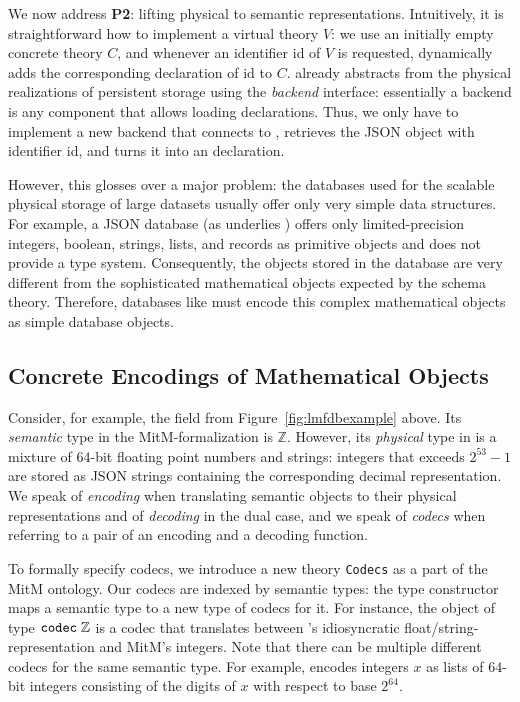 We now address \textbf{P2}: lifting physical to semantic representations.
Intuitively, it is straightforward how to implement a virtual theory $V$: we use an initially empty concrete theory $C$, and whenever an identifier \textsf{id} of $V$ is requested, \mmt dynamically adds the corresponding declaration of \textsf{id} to $C$.
\mmt already abstracts from the physical realizations of persistent storage using the \emph{backend} interface: essentially a backend is any component that allows loading declarations.
Thus, we only have to implement a new backend that connects to \lmfdb, retrieves the JSON object with identifier \textsf{id}, and turns it into an \ommt declaration.

However, this glosses over a major problem: the databases used for the scalable physical storage of large datasets usually offer only very simple data structures.
For example, a JSON database (as underlies \lmfdb) offers only limited-precision integers, boolean, strings, lists, and records as primitive objects and does not provide a type system.
Consequently, the objects stored in the database are very different from the sophisticated mathematical objects expected by the schema theory.
Therefore, databases like \lmfdb must encode this complex mathematical objects as simple database objects.

\subsection{Concrete Encodings of Mathematical Objects}\label{sec:vt:translation}

Consider, for example, the field  from Figure~\ref{fig:lmfdbexample} above.
Its \emph{semantic} type in the MitM-formalization is $\mathbb{Z}$.
However, its \emph{physical} type in \lmfdb is  a mixture of $64$-bit floating point numbers and strings:
integers that exceeds $2^{53}-1$ are stored as JSON strings containing the corresponding decimal representation.
We speak of \emph{encoding} when translating semantic objects to their physical representations and of \emph{decoding} in the dual case, and we speak of \emph{codecs} when referring to a pair of an encoding and a decoding function.

To formally specify codecs, we introduce a new \ommt theory \texttt{Codecs} as a part of the MitM ontology.
Our codecs are indexed by semantic types: the type constructor \codectt maps a semantic type to a new type of codecs for it.
For instance, the object  of type $\codectt\;\mathbb{Z}$ is a codec that translates between \lmfdb's idiosyncratic float/string-representation and MitM's integers.
Note that there can be multiple different codecs for the same semantic type.
For example,  encodes integers $x$ as lists of $64$-bit integers consisting of the digits of $x$ with respect to base $2^{64}$.

